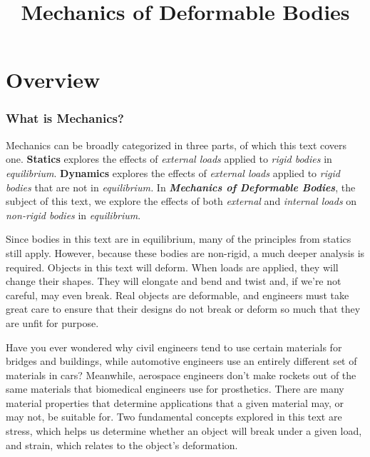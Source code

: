 \documentclass[
  letterpaper,
  DIV=11,
  numbers=noendperiod]{scrreprt}
\title{Mechanics of Deformable Bodies}
\author{}
\date{}
\renewcommand*\contentsname{Table of contents}
\newcommand\contentsname{Table of contents}
\theoremstyle{definition}
\theoremstyle{remark}
\begin{document}
\maketitle

\renewcommand*\contentsname{Table of contents}
{
\hypersetup{linkcolor=}
\setcounter{tocdepth}{2}
\tableofcontents
}

\chapter*{Overview}\label{overview}


\subsection*{What is Mechanics?}\label{what-is-mechanics}

Mechanics can be broadly categorized in three parts, of which this text
covers one. \textbf{Statics} explores the effects of \emph{external
loads} applied to \emph{rigid bodies} in \emph{equilibrium}.
\textbf{Dynamics} explores the effects of \emph{external loads} applied
to \emph{rigid bodies} that are not in \emph{equilibrium.} In
\textbf{\emph{Mechanics of Deformable Bodies}}, the subject of this
text, we explore the effects of both \emph{external} and \emph{internal
loads} on \emph{non-rigid bodies} in \emph{equilibrium}.

Since bodies in this text are in equilibrium, many of the principles
from statics still apply. However, because these bodies are non-rigid, a
much deeper analysis is required. Objects in this text will deform. When
loads are applied, they will change their shapes. They will elongate and
bend and twist and, if we're not careful, may even break. Real objects
are deformable, and engineers must take great care to ensure that their
designs do not break or deform so much that they are unfit for purpose.

Have you ever wondered why civil engineers tend to use certain materials
for bridges and buildings, while automotive engineers use an entirely
different set of materials in cars? Meanwhile, aerospace engineers don't
make rockets out of the same materials that biomedical engineers use for
prosthetics. There are many material properties that determine
applications that a given material may, or may not, be suitable for. Two
fundamental concepts explored in this text are stress, which helps us
determine whether an object will break under a given load, and strain,
which relates to the object's deformation.
\end{document}
